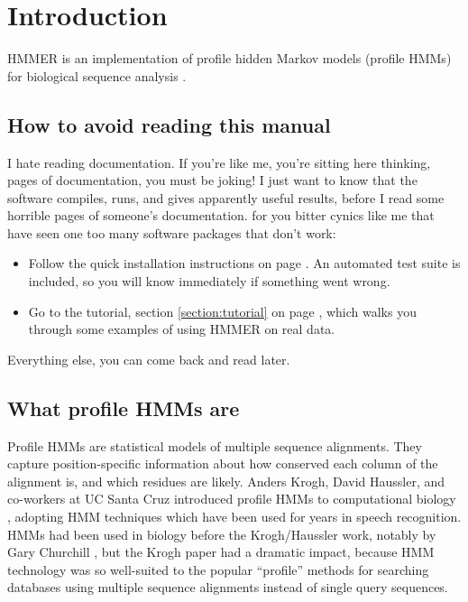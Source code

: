 \section{Introduction}

HMMER is an implementation of profile hidden Markov models (profile
HMMs) for biological sequence analysis
\cite{Krogh94,Eddy98,Durbin98}. 

\subsection{How to avoid reading this manual}

I hate reading documentation. If you're like me, you're sitting here
thinking, \pageref{manualend} pages of documentation, you must be
joking! I just want to know that the software compiles, runs, and
gives apparently useful results, before I read some horrible
\pageref{manualend} pages of someone's documentation. for you bitter
cynics like me that have seen one too many software packages that
don't work:

\begin{itemize}
\item Follow the quick installation instructions on page
      \pageref{section:installation}. An automated test suite
      is included, so you will know immediately if something
      went wrong.
\item Go to the tutorial, section \ref{section:tutorial} on page
\pageref{section:tutorial}, which walks you through some examples of
using HMMER on real data.
\end{itemize}

Everything else, you can come back and read later.

\subsection{What profile HMMs are}

Profile HMMs are statistical models of multiple sequence alignments.
They capture position-specific information about how conserved each
column of the alignment is, and which residues are likely.  Anders
Krogh, David Haussler, and co-workers at UC Santa Cruz introduced
profile HMMs to computational biology \cite{Krogh94}, adopting HMM
techniques which have been used for years in speech recognition. HMMs
had been used in biology before the Krogh/Haussler work, notably by
Gary Churchill \cite{Churchill89}, but the Krogh paper had a dramatic
impact, because HMM technology was so well-suited to the popular
``profile'' methods for searching databases using multiple sequence
alignments instead of single query sequences. 

